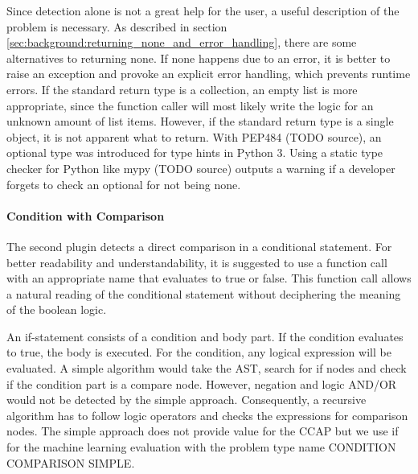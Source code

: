 Since detection alone is not a great help for the user, a useful description of the problem is necessary. 
As described in section \ref{sec:background:returning_none_and_error_handling}, there are some alternatives to returning none. If none happens due to an error, it is better to raise an exception and provoke an explicit error handling, which prevents runtime errors. If the standard return type is a collection, an empty list is more appropriate, since the function caller will most likely write the logic for an unknown amount of list items. However, if the standard return type is a single object, it is not apparent what to return. With PEP484 (TODO source), an optional type was introduced for type hints in Python 3. Using a static type checker for Python like mypy (TODO source) outputs a warning if a developer forgets to check an optional for not being none. 

\paragraph{Condition with Comparison}\label{sec:condition_comparison}
The second plugin detects a direct comparison in a conditional statement. For better readability and understandability, it is suggested to use a function call with an appropriate name that evaluates to true or false. This function call allows a natural reading of the conditional statement without deciphering the meaning of the boolean logic.

An if-statement consists of a condition and body part. If the condition evaluates to true, the body is executed. For the condition, any logical expression will be evaluated. A simple algorithm would take the AST, search for if nodes and check if the condition part is a compare node.
However, negation and logic AND/OR would not be detected by the simple approach. Consequently, a recursive algorithm has to follow logic operators and checks the expressions for comparison nodes. The simple approach does not provide value for the CCAP but we use if for the machine learning evaluation with the problem type name CONDITION COMPARISON SIMPLE.

